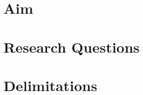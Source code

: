 \section{Aim}
\label{sec:aim}

\section{Research Questions}
\label{sec:research-questions}

\section{Delimitations}
\label{sec:delimitations}

